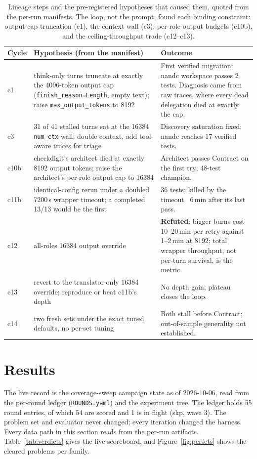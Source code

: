 \documentclass[11pt]{article}
\begin{document}
\begin{table}[ht]
\centering
\begin{tabular}{@{}p{1.1cm}p{5.2cm}p{7.6cm}@{}}
\toprule
Cycle & Hypothesis (from the manifest) & Outcome \\
\midrule
c1 & think-only turns truncate at exactly the 4096-token output cap
(\texttt{finish\_reason=Length}, empty text); raise
\texttt{max\_output\_tokens} to 8192 & First verified migration:
nandc workspace passes 2 tests. Diagnosis came from raw traces, where
every dead delegation died at exactly the cap. \\
c3 & 31 of 41 stalled turns sat at the 16384 \texttt{num\_ctx} wall;
double context, add tool-aware traces for triage & Discovery
saturation fixed; nandc reaches 17 verified tests. \\
c10b & checkdigit's architect died at exactly 8192 output tokens;
raise the architect's per-role output cap to 16384 & Architect passes
Contract on the first try; 48-test champion. \\
c11b & identical-config rerun under a doubled 7200\,s wrapper timeout;
a completed 13/13 would be the first & 36 tests; killed by the
timeout ~6\,min after its last pass. \\
c12 & all-roles 16384 output override & \textbf{Refuted}: bigger burns
cost 10--20\,min per retry against 1--2\,min at 8192; total wrapper
throughput, not per-turn survival, is the metric. \\
c13 & revert to the translator-only 16384 override; reproduce or beat
c11b's depth & No depth gain; plateau closes the loop. \\
c14 & two fresh sets under the exact tuned defaults, no per-set
tuning & Both stall before Contract; out-of-sample generality not
established. \\
\bottomrule
\end{tabular}
\caption{Lineage steps and the pre-registered hypotheses that caused
them, quoted from the per-run manifests. The loop, not the prompt,
found each binding constraint: output-cap truncation (c1), the context
wall (c3), per-role output budgets (c10b), and the ceiling-throughput
trade (c12--c13).}
\label{tab:lineage}
\end{table}

\section{Results}
\label{sec:results}

The live record is the coverage-sweep campaign state as of 2026-10-06,
read from the per-round ledger (\texttt{ROUNDS.yaml}) and the experiment
tree. The ledger holds 55 round entries, of which 54 are scored and 1 is
in flight (skp, wave 3). The
problem set and evaluator never changed; every iteration changed the
harness. Every data path in this section reads from the per-run
artifacts. Table~\ref{tab:verdicts} gives the live scoreboard, and
Figure~\ref{fig:persets} shows the cleared problems per family.
\end{document}

